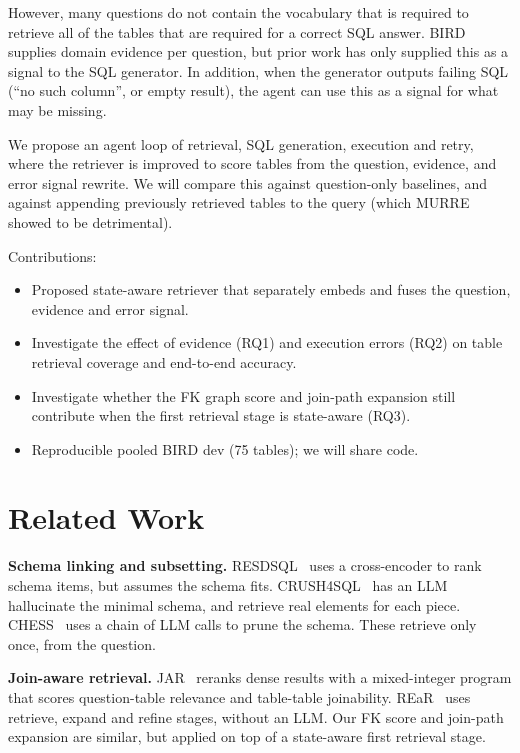 \documentclass[sigconf,nonacm]{acmart}
\begin{document}
However, many questions do not contain the vocabulary that is required to retrieve all of the tables that are required for a correct SQL answer. BIRD~\cite{bird} supplies domain evidence per question, but prior work has only supplied this as a signal to the SQL generator. In addition, when the generator outputs failing SQL (``no such column'', or empty result), the agent can use this as a signal for what may be missing.

We propose an agent loop of retrieval, SQL generation, execution and retry, where the retriever is improved to score tables from the question, evidence, and error signal rewrite. We will compare this against question-only baselines, and against appending previously retrieved tables to the query (which MURRE~\cite{murre} showed to be detrimental).

Contributions:
\begin{itemize}
\item Proposed state-aware retriever that separately embeds and fuses the question, evidence and error signal.
\item Investigate the effect of evidence (RQ1) and execution errors (RQ2) on table retrieval coverage and end-to-end accuracy.
\item Investigate whether the FK graph score and join-path expansion still contribute when the first retrieval stage is state-aware (RQ3).
\item Reproducible pooled BIRD dev (75 tables); we will share code.
\end{itemize}

\section{Related Work}

\textbf{Schema linking and subsetting.} RESDSQL~\cite{resdsql} uses a cross-encoder to rank schema items, but assumes the schema fits. CRUSH4SQL~\cite{crush} has an LLM hallucinate the minimal schema, and retrieve real elements for each piece. CHESS~\cite{chess} uses a chain of LLM calls to prune the schema. These retrieve only once, from the question.

\textbf{Join-aware retrieval.} JAR~\cite{jar} reranks dense results with a mixed-integer program that scores question-table relevance and table-table joinability. REaR~\cite{rear} uses retrieve, expand and refine stages, without an LLM. Our FK score and join-path expansion are similar, but applied on top of a state-aware first retrieval stage.
\end{document}
